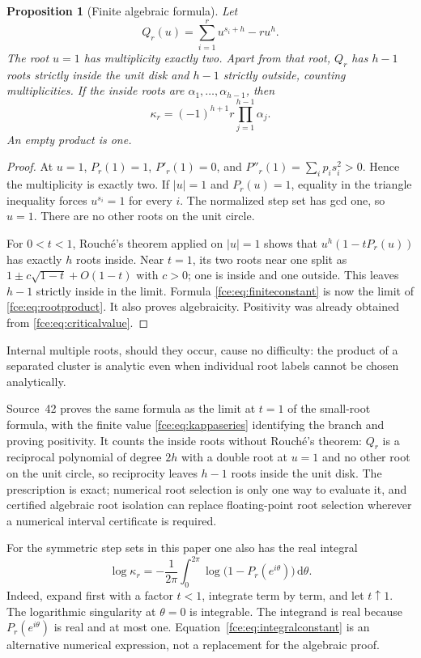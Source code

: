 \documentclass[11pt,a4paper]{article}
\numberwithin{equation}{section}
\newtheorem{proposition}[theorem]{Proposition}
\theoremstyle{definition}\newtheorem{definition}[theorem]{Definition}
\theoremstyle{remark}\newtheorem{remark}[theorem]{Remark}
\newcommand{\dd}{\,\mathrm d}
\begin{document}
\begin{proposition}[Finite algebraic formula]\label{fce:prop:kappa}
Let
\begin{equation}\label{fce:eq:Q}
 Q_r(u)=\sum_{i=1}^r u^{s_i+h}-r u^h.
\end{equation}
The root $u=1$ has multiplicity exactly two. Apart from that root,
$Q_r$ has $h-1$ roots strictly inside the unit disk and $h-1$ strictly
outside, counting multiplicities. If the inside roots are
$\alpha_1,\ldots,\alpha_{h-1}$, then
\begin{equation}\label{fce:eq:finiteconstant}
 \kappa_r=(-1)^{h+1}r\prod_{j=1}^{h-1}\alpha_j.
\end{equation}
An empty product is one.
\end{proposition}
\begin{proof}
At $u=1$, $P_r(1)=1$, $P'_r(1)=0$, and
$P''_r(1)=\sum_i p_i s_i^2>0$. Hence the multiplicity is exactly two.
If $|u|=1$ and $P_r(u)=1$, equality in the triangle inequality forces
$u^{s_i}=1$ for every $i$. The normalized step set has gcd one, so $u=1$.
There are no other roots on the unit circle.

For $0<t<1$, Rouch\'e's theorem applied on $|u|=1$ shows that
$u^h(1-tP_r(u))$ has exactly $h$ roots inside. Near $t=1$, its two roots
near one split as $1\pm c\sqrt{1-t}+O(1-t)$ with $c>0$; one is inside
and one outside. This leaves $h-1$ strictly inside in the limit. Formula
\eqref{fce:eq:finiteconstant} is now the limit of \eqref{fce:eq:rootproduct}.
It also proves algebraicity. Positivity was already obtained from
\eqref{fce:eq:criticalvalue}.
\end{proof}
Internal multiple roots, should they occur, cause no difficulty: the
product of a separated cluster is analytic even when individual root
labels cannot be chosen analytically.

Source~42 proves the same formula as the limit at $t=1$ of the small-root
formula, with the finite value \eqref{fce:eq:kappaseries} identifying the
branch and proving positivity. It counts the inside roots without
Rouch\'e's theorem: $Q_r$ is a reciprocal polynomial of degree $2h$ with a
double root at $u=1$ and no other root on the unit circle, so reciprocity
leaves $h-1$ roots inside the unit disk. The prescription is exact;
numerical root selection is only one way to evaluate it, and certified
algebraic root isolation can replace floating-point root selection
wherever a numerical interval certificate is required.

For the symmetric step sets in this paper one also has the real integral
\begin{equation}\label{fce:eq:integralconstant}
 \log\kappa_r=-\frac1{2\pi}\int_0^{2\pi}
                       \log\bigl(1-P_r(e^{i\theta})\bigr)\dd\theta.
\end{equation}
Indeed, expand first with a factor $t<1$, integrate term by term, and let
$t\uparrow1$. The logarithmic singularity at $\theta=0$ is integrable.
The integrand is real because $P_r(e^{i\theta})$ is real and at most one.
Equation~\eqref{fce:eq:integralconstant} is an alternative numerical expression,
not a replacement for the algebraic proof.
\end{document}
